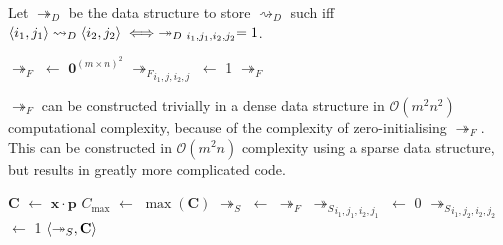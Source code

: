 \begin{definition}
	\label{tensorfixeddecisionframework}
	
	Let $\twoheadrightarrow_D$ be the data structure to store $\rightsquigarrow_D$ such iff $\pair{i_1}{j_1}\rightsquigarrow_D\pair{i_2}{j_2}\iff\twoheadrightarrow_{D\ i_1,j_1,i_2,j_2}=1$.
\end{definition}

\begin{algorithm}[H]
	\caption{}
	\begin{algorithmic}[1]
			\State $\twoheadrightarrow_F$ $\gets$ $\mathbf{0}^{(m\times n)^2}$
							\State ${\twoheadrightarrow_F}_{i_1,j,i_2,j}$ $\gets$ 1
						\EndIf
					\EndFor
				\EndFor
			\EndFor
			\State \Return $\twoheadrightarrow_F$
		\EndFunction
	\end{algorithmic}
\end{algorithm}

$\twoheadrightarrow_F$ can be constructed trivially in a dense data structure in $\mathcal{O}(m^2n^2)$ computational complexity, because of the complexity of zero-initialising $\twoheadrightarrow_F$. This can be constructed in $\mathcal{O}(m^2n)$ complexity using a sparse data structure, but results in greatly more complicated code.

\begin{algorithm}[H]
	\caption{}
	\begin{algorithmic}[1]
			\State $\mathbf{C}$ $\gets$ $\mathbf{x}\cdot\mathbf{p}$
			\State $C_{\max}$ $\gets$ $\max(\mathbf{C})$
			\State $\twoheadrightarrow_S$ $\gets$ $\twoheadrightarrow_F$
									\State ${\twoheadrightarrow_S}_{i_1,j_1,i_2,j_1}$ $\gets$ 0
								\EndIf
										\State ${\twoheadrightarrow_S}_{i_1,j_2,i_2,j_2}$ $\gets$ 1
									\EndIf
								\EndFor
							\EndFor
						\EndIf
					\EndFor
				\EndIf
			\EndFor
			\State \Return $\langle{\twoheadrightarrow_S},{\mathbf{C}}\rangle$
		\EndFunction
	\end{algorithmic}
\end{algorithm}

